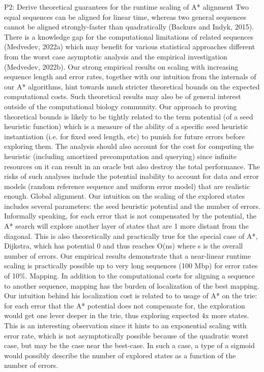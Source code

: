 P2: Derive theoretical guarantees for the runtime scaling of A* alignment
Two equal sequences can be aligned for linear time, whereas two general sequences cannot be aligned strongly-faster than quadratically (Backurs and Indyk, 2015). There is a knowledge gap for the computational limitations of related sequences (Medvedev, 2022a) which may benefit for various statistical approaches different from the worst case asymptotic analysis and the empirical investigation (Medvedev, 2022b). Our strong empirical results on scaling with increasing sequence length and error rates, together with our intuition from the internals of our A* algorithms, hint towards much stricter theoretical bounds on the expected computational costs. Such theoretical results may also be of general interest outside of the computational biology community.
    Our approach to proving theoretical bounds is likely to be tightly related to the term potential (of a seed heuristic function) which is a measure of the ability of a specific seed heuristic instantiation (i.e. for fixed seed length, etc) to punish for future errors before exploring them. The analysis should also account for the cost for computing the heuristic (including amortized precomputation and querying) since infinite resources on it can result in an oracle but also destroy the total performance. The risks of such analyses include the potential inability to account for data and error models (random reference sequence and uniform error model) that are realistic enough.
Global alignment. Our intuition on the scaling of the explored states includes several parameters: the seed heuristic potential and the number of errors. Informally speaking, for each error that is not compensated by the potential, the A* search will explore another layer of states that are 1 more distant from the diagonal. This is also theoretically and practically true for the special case of A*, Dijkstra, which has potential 0 and thus reaches O(ns) where s is the overall number of errors. Our empirical results demonstrate that a near-linear runtime scaling is practically possible up to very long sequences (100 Mbp) for error rates of 10\%.
Mapping. In addition to the computational costs for aligning a sequence to another sequence, mapping has the burden of localization of the best mapping. Our intuition behind his localization cost is related to to usage of A* on the trie: for each error that the A* potential does not compensate for, the exploration would get one lever deeper in the trie, thus exploring expected 4x more states. This is an interesting observation since it hints to an exponential scaling with error rate, which is not asymptotically possible because of the quadratic worst case, but may be the case near the best-case. In such a case, a type of a sigmoid would possibly describe the number of explored states as a function of the number of errors.

